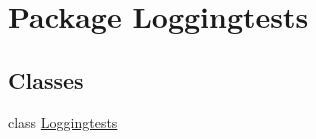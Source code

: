 \hypertarget{namespace_loggingtests}{}\section{Package Loggingtests}
\label{namespace_loggingtests}
\subsection*{Classes}
\begin{DoxyCompactItemize}
\item 
class \hyperlink{class_loggingtests_1_1_loggingtests}{Loggingtests}
\end{DoxyCompactItemize}
